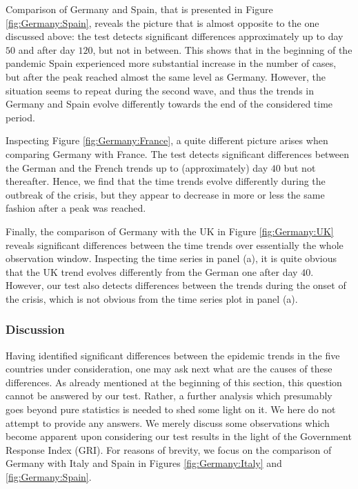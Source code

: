 \documentclass[a4paper,12pt]{article}
\numberwithin{equation}{section}
\begin{document}
{\color{red}Comparison of Germany and Spain, that is presented in Figure \ref{fig:Germany:Spain}, reveals the picture that is almost opposite to the one discussed above: the test detects significant differences approximately up to day $50$ and after day $120$, but not in between. This shows that in the beginning of the pandemic Spain experienced more substantial increase in the number of cases, but after the peak reached almost the same level as Germany. However, the situation seems to repeat during the second wave, and thus the trends in Germany and Spain evolve differently towards the end of the considered time period.

Inspecting Figure \ref{fig:Germany:France}, a quite different picture arises when comparing Germany with France. The test detects significant differences between the German and the French trends up to (approximately) day $40$ but not thereafter. Hence, we find that the time trends evolve differently during the outbreak of the crisis, but they appear to decrease in more or less the same fashion after a peak was reached.}

Finally, the comparison of Germany with the UK in Figure \ref{fig:Germany:UK} reveals significant differences between the time trends over essentially the whole observation window. Inspecting the time series in panel (a), it is quite obvious that the UK trend evolves differently from the German one after day $40$. However, our test also detects differences between the trends during the onset of the crisis, which is not obvious from the time series plot in panel (a). 


\subsubsection{Discussion}


Having identified significant differences between the epidemic trends in the five countries under consideration, one may ask next what are the causes of these differences. As already mentioned at the beginning of this section, this question cannot be answered by our test. Rather, a further analysis which presumably goes beyond pure statistics is needed to shed some light on it. We here do not attempt to provide any answers. We merely discuss some observations which become apparent upon considering our test results in the light of the Government Response Index (GRI). For reasons of brevity, we focus on the comparison of Germany with Italy and Spain in Figures \ref{fig:Germany:Italy} and \ref{fig:Germany:Spain}. 
\end{document}
